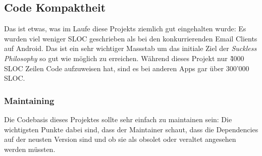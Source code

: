 \documentclass[a4paper,11pt]{article}
\begin{document}

\subsection{Code Kompaktheit}
Das ist etwas, was im Laufe diese Projekts ziemlich gut eingehalten wurde: Es wurden viel weniger SLOC geschrieben als bei den konkurrierenden Email Clients auf Android. Das ist ein sehr wichtiger Massstab um das initiale Ziel der \textit{Suckless Philosophy} so gut wie möglich zu erreichen. Während dieses Projekt nur \~ 4000 SLOC Zeilen Code aufzuweisen hat, sind es bei anderen Apps gar über 300'000 SLOC.
\subsubsection{Maintaining}
Die Codebasis dieses Projektes sollte sehr einfach zu maintainen sein: Die wichtigsten Punkte dabei sind, dass der Maintainer schaut, dass die Dependencies auf der neusten Version sind und ob sie als obsolet oder veraltet angesehen werden müssten.\\
\end{document}
